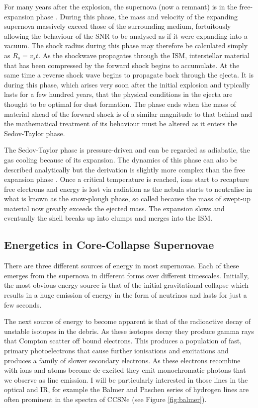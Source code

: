 For many years after the explosion, the supernova (now a remnant) is in the free-expansion phase \citep{Landau1959,Ostriker1988}. During this phase, the mass and velocity of the expanding supernova massively exceed those of the surrounding medium, fortuitously allowing the behaviour of the SNR to be analysed as if it were expanding into a vacuum.  The shock radius during this phase may therefore be calculated simply as $R_s = v_s t$.  As the shockwave propagates through the ISM, interstellar material that has been compressed by the forward shock begins to accumulate.  At the same time a reverse shock wave begins to propagate back through the ejecta.  It is during this phase, which arises very soon after the initial explosion and typically lasts for a few hundred years, that the physical conditions in the ejecta are thought to be optimal for dust formation.  The phase ends when the mass of material ahead of the forward shock is of a similar magnitude to that behind and the mathematical treatment of its behaviour must be altered as it enters the Sedov-Taylor phase.
 
The Sedov-Taylor phase is pressure-driven and can be regarded as adiabatic, the gas cooling because of its expansion. The dynamics of this phase can also be described analytically but the derivation is slightly more complex than the free expansion phase \citep{Taylor1950,Sedov1959}.  Once a critical temperature is reached, ions start to recapture free electrons and energy is lost via radiation as the nebula starts to neutralise in what is known as the snow-plough phase, so called because the mass of swept-up material now greatly exceeds the ejected mass.  The expansion slows and eventually the shell breaks up into clumps and merges into the ISM.

 
 \subsection{Energetics in Core-Collapse Supernovae}

There are three different sources of energy in most supernovae.  Each of these emerges from the supernova in different forms over different timescales.  Initially, the most obvious energy source is that of the initial gravitational collapse which results in a huge emission of energy in the form of neutrinos and lasts for just a few seconds.  

The next source of energy to become apparent is that of the radioactive decay of unstable isotopes in the debris.  As these isotopes decay they produce gamma rays that Compton scatter off bound electrons.  This produces a population of fast, primary photoelectrons that cause further ionisations and excitations and produces a family of slower secondary electrons.  As these electrons recombine with ions and atoms become de-excited they emit monochromatic photons that we observe as line emission.  I will be particularly interested in those lines in the optical and IR, for example the Balmer and Paschen series of hydrogen lines are often prominent in the spectra of CCSNe (see Figure \ref{fig:balmer}).

